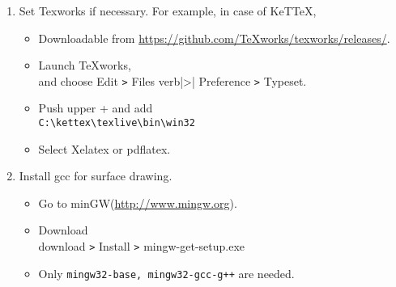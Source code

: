 \documentclass{article}
\begin{document}
\begin{enumerate}[\bf\large 1.]
\item Set Texworks if necessary. For example, in case of KeTTeX,
  \begin{itemize}
  \item Downloadable from \url{https://github.com/TeXworks/texworks/releases/}.
  \item Launch TeXworks,\\
  \hspace*{10mm}and choose Edit \verb|>| Files verb|>| Preference \verb|>| Typeset.
  \item Push upper + and add\\
  \hspace*{5mm}\verb|C:\kettex\texlive\bin\win32|
  \item Select Xelatex or pdflatex.
  \end{itemize}

\item Install gcc for surface drawing.
  \begin{itemize}
  \item Go to  minGW(\url{http://www.mingw.org}).
  \item Download\\
  \hspace*{10mm}download \verb|>| Install \verb|>| mingw-get-setup.exe
  \item Only \verb|mingw32-base, mingw32-gcc-g++| are needed.
  \end{itemize}

\end{enumerate}
\end{document}
